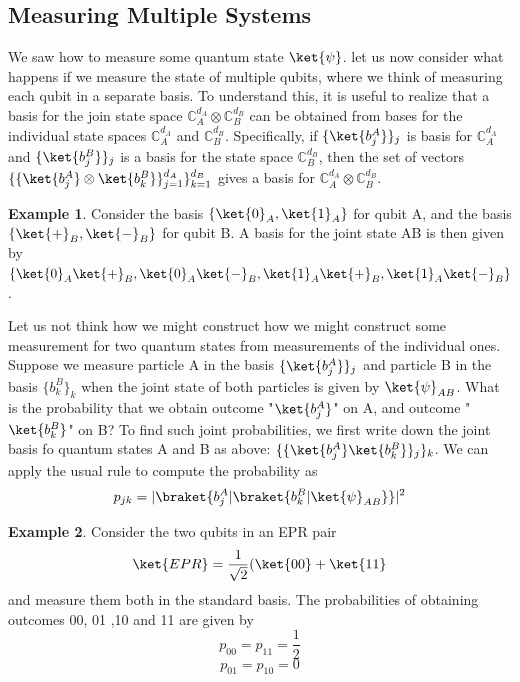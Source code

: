 \documentclass[12pt, oneside]{book}
\theoremstyle{definition}
\theoremstyle{definition}
\newtheorem{example}{Example}[section]
\theoremstyle{remark}
\begin{document}
\subsection{Measuring Multiple Systems}
We saw how to measure some quantum state $\ket{\psi}$. let us now consider what happens if we measure the state of multiple qubits, where we think of measuring each qubit in a separate basis. To understand this, it is useful to realize that a basis for the join state space $\mathbb{C}_A^{d_A} \otimes \mathbb{C}_B^{d_B}$ can be obtained from bases for the individual state spaces $\mathbb{C}_A^{d_A}$ and $\mathbb{C}_B^{d_B}$. Specifically, if $\{\ket{b_j^A}\}_j$ is basis for $\mathbb{C}_A^{d_A}$ and $\{\ket{b_j^B}\}_j$ is a basis for the state space $\mathbb{C}_B^{d_B}$, then the set of vectors $\{\{\ket{b_j^A}\otimes \ket{b_k^B}\}_{j=1}^{d_A}\}_{k=1}^{d_B}$ gives a basis for $\mathbb{C}_A^{d_A}\otimes \mathbb{C}_B^{d_B}$.

\begin{example}
    Consider the basis $\{\ket{0}_A,\ket{1}_A\}$ for qubit A, and the basis $\{\ket{+}_B,\ket{-}_B\}$ for qubit B. A basis for the joint state AB is then given by $\{\ket{0}_A\ket{+}_B,\ket{0}_A\ket{-}_B,\ket{1}_A\ket{+}_B,\ket{1}_A\ket{-}_B\}$.
\end{example}

Let us not think how we might construct how we might construct some measurement for two quantum states from measurements of the individual ones. Suppose we measure particle A in the basis $\{\ket{b_j^A}\}_j$ and particle B in the basis $\{b_k^B\}_k$ when the joint state of both particles is given by $\ket{\psi}_{AB}$. What is the probability that we obtain outcome "$\ket{b_j^A}$" on A, and outcome "$\ket{b_k^B}$" on B? To find such joint probabilities, we first write down the joint basis fo quantum states A and B as above: $\{\{\ket{b_j^A}\ket{b_k^B}\}_j\}_k$. We can apply the usual rule to compute the probability as 
\[
p_{jk}=|\braket{b_j^A|\braket{b_k^B|\ket{\psi}_{AB}}}|^2
\]
\begin{example}
    Consider the two qubits in an EPR pair
    \[
    \ket{EPR}=\frac{1}{\sqrt{2}}(\ket{00}+\ket{11}
    \]
    and measure them both in the standard basis. The probabilities of obtaining outcomes 00, 01 ,10 and 11 are given by
    \[
    p_{00}=p_{11}=\frac{1}{2}
    \]
    \[
    p_{01}=p_{10}=0
    \]
\end{example}
\end{document}
